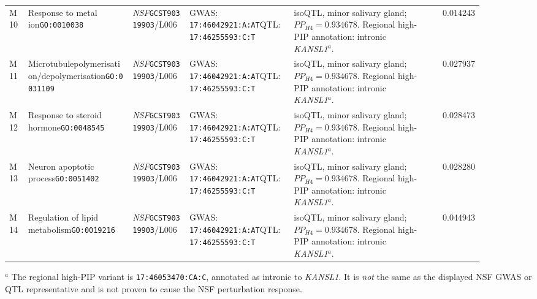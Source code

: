 \documentclass[11pt,a4paper]{article}
\begin{document}
\begin{landscape}
\begin{longtable}{@{}Y{0.040\linewidth}Y{0.225\linewidth}Y{0.125\linewidth}Y{0.225\linewidth}Y{0.280\linewidth}r@{}}
M10 & Response to metal ion\newline\texttt{GO:0010038} & \textit{NSF}\newline\texttt{GCST90319903}/L006 & GWAS: \texttt{17:46042921:A:AT}\newline QTL: \texttt{17:46255593:C:T} & isoQTL, minor salivary gland; $PP_{H4}=0.934678$. Regional high-PIP annotation: intronic \textit{KANSL1}$^{a}$. & 0.014243 \\
M11 & Microtubule\newline polymerisation/\allowbreak depolymerisation\newline\texttt{GO:0031109} & \textit{NSF}\newline\texttt{GCST90319903}/L006 & GWAS: \texttt{17:46042921:A:AT}\newline QTL: \texttt{17:46255593:C:T} & isoQTL, minor salivary gland; $PP_{H4}=0.934678$. Regional high-PIP annotation: intronic \textit{KANSL1}$^{a}$. & 0.027937 \\
M12 & Response to steroid hormone\newline\texttt{GO:0048545} & \textit{NSF}\newline\texttt{GCST90319903}/L006 & GWAS: \texttt{17:46042921:A:AT}\newline QTL: \texttt{17:46255593:C:T} & isoQTL, minor salivary gland; $PP_{H4}=0.934678$. Regional high-PIP annotation: intronic \textit{KANSL1}$^{a}$. & 0.028473 \\
M13 & Neuron apoptotic process\newline\texttt{GO:0051402} & \textit{NSF}\newline\texttt{GCST90319903}/L006 & GWAS: \texttt{17:46042921:A:AT}\newline QTL: \texttt{17:46255593:C:T} & isoQTL, minor salivary gland; $PP_{H4}=0.934678$. Regional high-PIP annotation: intronic \textit{KANSL1}$^{a}$. & 0.028280 \\
M14 & Regulation of lipid metabolism\newline\texttt{GO:0019216} & \textit{NSF}\newline\texttt{GCST90319903}/L006 & GWAS: \texttt{17:46042921:A:AT}\newline QTL: \texttt{17:46255593:C:T} & isoQTL, minor salivary gland; $PP_{H4}=0.934678$. Regional high-PIP annotation: intronic \textit{KANSL1}$^{a}$. & 0.044943 \\
\end{longtable}
\noindent\footnotesize
$^{a}$ The regional high-PIP variant is \texttt{17:46053470:CA:C}, annotated as intronic to
\textit{KANSL1}. It is \emph{not} the same as the displayed NSF GWAS or QTL representative and is not proven to cause the NSF perturbation response.

\end{landscape}
\end{document}

